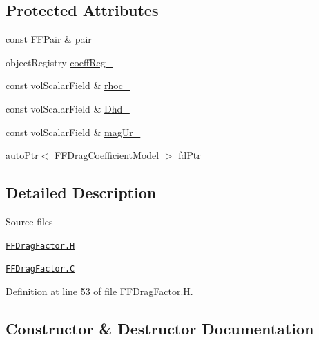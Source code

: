 \subsection*{Protected Attributes}
\begin{DoxyCompactItemize}
\item 
const \hyperlink{classFoam_1_1FFPair}{F\+F\+Pair} \& \hyperlink{classFoam_1_1FFDragFactor_ad015e769561f394d7c717d4356dcded4}{pair\+\_\+}
\item 
object\+Registry \hyperlink{classFoam_1_1FFDragFactor_af76383731fdca7e747b11d6730243ae3}{coeff\+Reg\+\_\+}
\item 
const vol\+Scalar\+Field \& \hyperlink{classFoam_1_1FFDragFactor_a1294acbd41120f3355b85cf0e083ba43}{rhoc\+\_\+}
\item 
const vol\+Scalar\+Field \& \hyperlink{classFoam_1_1FFDragFactor_af6dfd1bab81d1dc5d9b4cd5bc0bcb9e7}{Dhd\+\_\+}
\item 
const vol\+Scalar\+Field \& \hyperlink{classFoam_1_1FFDragFactor_ad5de9ba3c0037343b1e83a03d41fa082}{mag\+Ur\+\_\+}
\item 
auto\+Ptr$<$ \hyperlink{classFoam_1_1FFDragCoefficientModel}{F\+F\+Drag\+Coefficient\+Model} $>$ \hyperlink{classFoam_1_1FFDragFactor_afec5f0297222ed448a00e23e192cea9c}{fd\+Ptr\+\_\+}
\end{DoxyCompactItemize}


\subsection{Detailed Description}
\begin{DoxyParagraph}{Source files}

\begin{DoxyItemize}
\item \href{../../../home/carlo/data/GeN-Foam/GeN-Foam_ffn/GeN-Foam/GeN-Foam/classes/thermalHydraulics/src/physicsModels/dragModels/FFDragFactor.H}{\tt F\+F\+Drag\+Factor.\+H} 
\item \href{../../../home/carlo/data/GeN-Foam/GeN-Foam_ffn/GeN-Foam/GeN-Foam/classes/thermalHydraulics/src/physicsModels/dragModels/FFDragFactor.C}{\tt F\+F\+Drag\+Factor.\+C} 
\end{DoxyItemize}
\end{DoxyParagraph}


Definition at line 53 of file F\+F\+Drag\+Factor.\+H.



\subsection{Constructor \& Destructor Documentation}
\mbox{\label{classFoam_1_1FFDragFactor_afb439ee14b37b829d91e386da5320f3d}} 
